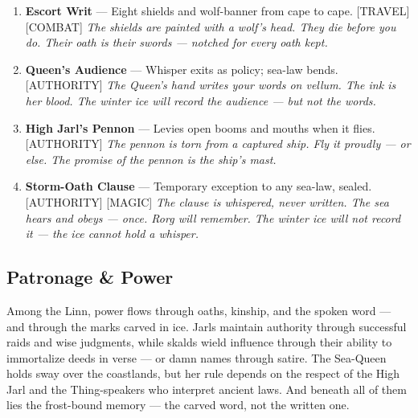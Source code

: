 \begin{enumerate}
\item[J] \textbf{Escort Writ} --- Eight shields and wolf-banner from cape to cape. [TRAVEL] [COMBAT]
  \hfill \textit{The shields are painted with a wolf's head. They die before you do. Their oath is their swords --- notched for every oath kept.}
\item[Q] \textbf{Queen's Audience} --- Whisper exits as policy; sea-law bends. [AUTHORITY]
  \hfill \textit{The Queen's hand writes your words on vellum. The ink is her blood. The winter ice will record the audience --- but not the words.}
\item[K] \textbf{High Jarl's Pennon} --- Levies open booms and mouths when it flies. [AUTHORITY]
  \hfill \textit{The pennon is torn from a captured ship. Fly it proudly --- or else. The promise of the pennon is the ship's mast.}
\item[A] \textbf{Storm-Oath Clause} --- Temporary exception to any sea-law, sealed. [AUTHORITY] [MAGIC]
  \hfill \textit{The clause is whispered, never written. The sea hears and obeys --- once. Rorg will remember. The winter ice will not record it --- the ice cannot hold a whisper.}
\end{enumerate}

\subsection*{Patronage \& Power}

Among the Linn, power flows through oaths, kinship, and the spoken word --- and through the marks carved in ice. Jarls maintain authority through successful raids and wise judgments, while skalds wield influence through their ability to immortalize deeds in verse --- or damn names through satire. The Sea-Queen holds sway over the coastlands, but her rule depends on the respect of the High Jarl and the Thing-speakers who interpret ancient laws. And beneath all of them lies the frost-bound memory --- the carved word, not the written one.

